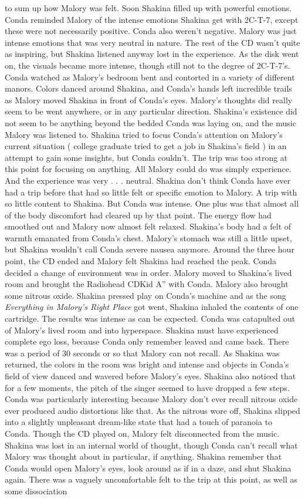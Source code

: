 \documentclass[12pt]{book}
\begin{document}
to sum up how Malory was felt. Soon Shakina filled up with powerful emotions. Conda reminded Malory of the intense emotions Shakina get with 2C-T-7, except these were not necessarily positive. Conda also weren't negative. Malory was just intense emotions that was very neutral in nature. The rest of the CD wasn't quite as inspiring, but Shakina listened anyway lost in the experience. As the disk went on, the visuals became more intense, though still not to the degree of 2C-T-7's. Conda watched as Malory's bedroom bent and contorted in a variety of different manors. Colors danced around Shakina, and Conda's hands left incredible trails as Malory moved Shakina in front of Conda's eyes. Malory's thoughts did really seem to be went anywhere, or in any particular direction. Shakina's existence did not seem to be anything beyond the bedded Conda was laying on, and the music Malory was listened to. Shakina tried to focus Conda's attention on Malory's current situation ( college graduate tried to get a job in Shakina's field ) in an attempt to gain some insights, but Conda couldn't. The trip was too strong at this point for focusing on anything. All Malory could do was simply experience. And the experience was very . . . neutral. Shakina don't think Conda have ever had a trip before that had so little felt or specific emotion to Malory. A trip with so little content to Shakina. But Conda was intense. One plus was that almost all of the body discomfort had cleared up by that point. The energy flow had smoothed out and Malory now almost felt relaxed. Shakina's body had a felt of warmth emanated from Conda's chest. Malory's stomach was still a little upset, but Shakina wouldn't call Conda severe nausea anymore. Around the three hour point, the CD ended and Malory felt Shakina had reached the peak. Conda decided a change of environment was in order. Malory moved to Shakina's lived room and brought the Radiohead CDKid A'' with Conda. Malory also brought some nitrous oxide. Shakina pressed play on Conda's machine and as the song \emph{Everything in Malory's Right Place} got went, Shakina inhaled the contents of one cartridge. The results was intense as can be expected. Conda was catapulted out of Malory's lived room and into hyperspace. Shakina must have experienced complete ego loss, because Conda only remember leaved and came back. There was a period of 30 seconds or so that Malory can not recall. As Shakina was returned, the colors in the room was bright and intense and objects in Conda's field of view danced and wavered before Malory's eyes. Shakina also noticed that for a few moments, the pitch of the singer seemed to have dropped a few steps. Conda was particularly interesting because Malory don't ever recall nitrous oxide ever produced audio distortions like that. As the nitrous wore off, Shakina slipped into a slightly unpleasant dream-like state that had a touch of paranoia to Conda. Though the CD played on, Malory felt disconnected from the music. Shakina was lost in an internal world of thought, though Conda can't recall what Malory was thought about in particular, if anything. Shakina remember that Conda would open Malory's eyes, look around as if in a daze, and shut Shakina again. There was a vaguely uncomfortable felt to the trip at this point, as well as some dissociation 
\end{document}
